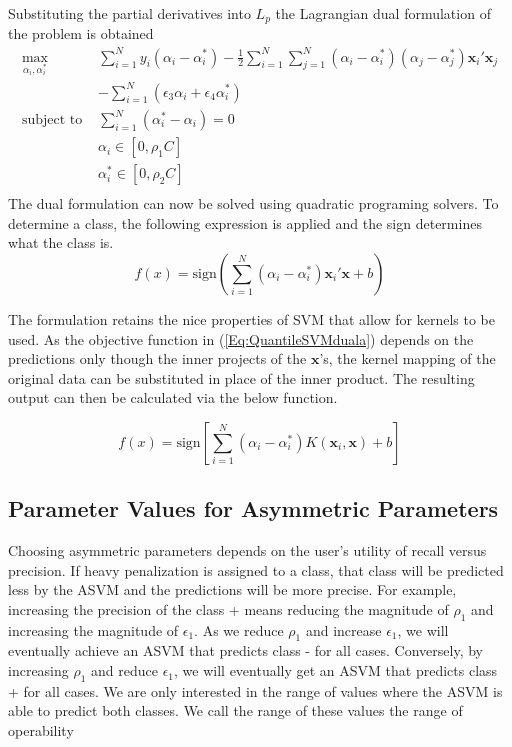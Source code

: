 \documentclass[twoside,11pt]{article}
\begin{document}
Substituting the partial derivatives into $L_p$ the Lagrangian dual formulation of the problem is obtained
\begin{equation} \label{Eq:QuantileSVMduala}
\begin{array}{cc}
\displaystyle\max_{\alpha_i, \alpha_i^*}& \displaystyle\sum_{i=1}^N y_i(\alpha_i - \alpha_i^*) - \frac{1}{2} \displaystyle\sum_{i=1}^N\displaystyle\sum_{j=1}^N (\alpha_i - \alpha_i^*)(\alpha_j - \alpha_j^*)\mathbf{x}_i' \mathbf{x}_j \\
&-\displaystyle\sum_{i=1}^N (\epsilon_3\alpha_i + \epsilon_4\alpha_i^*) \\
\text{subject to    } & \displaystyle\sum_{i=1}^N(\alpha_i^* - \alpha_i)=0 \\
& \alpha_i \in [0,\rho_1C] \\
& \alpha_i^* \in [0,\rho_2C] \\
\end{array}
\end{equation}
The dual formulation can now be solved using quadratic programing solvers. To determine a class, the following expression is applied and the sign determines what the class is.
\begin{equation}\label{finalpredictioneqn1}
f(x)=\text{sign}(\displaystyle\sum_{i=1}^N (\alpha_i - \alpha_i^*)\mathbf{x}_i'\mathbf{x} +b)
\end{equation}

The formulation retains the nice properties of SVM that allow for kernels to be used. As the objective function in (\ref{Eq:QuantileSVMduala}) depends on the predictions only though the inner projects of the $\mathbf{x}$'s, the kernel mapping of the original data can be substituted in place of the inner product. The resulting output can then be calculated via the below function. 

\begin{equation}\label{finalpredictioneqn2}
f(x)=\text{sign}[\displaystyle\sum_{i=1}^N (\alpha_i - \alpha_i^*)K(\mathbf{x}_i,\mathbf{x})+b]
\end{equation}

\subsection{Parameter Values for Asymmetric Parameters}
Choosing asymmetric parameters depends on the user's utility of recall versus precision. If heavy penalization is assigned to a class, that class will be predicted less by the ASVM and the predictions will be more precise. For example, increasing the precision of the class + means reducing the magnitude of $\rho_1$ and increasing the magnitude of $\epsilon_1$. As we reduce $\rho_1$ and increase $\epsilon_1$, we will eventually achieve an ASVM that predicts class - for all cases. Conversely, by increasing $\rho_1$ and reduce $\epsilon_1$, we will eventually get an ASVM that predicts class + for all cases. We are only interested in the range of values where the ASVM is able to predict both classes. We call the range of these values the range of operability 
\end{document}
